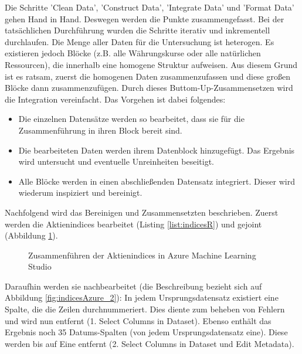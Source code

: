 Die Schritte 'Clean Data', 'Construct Data', 'Integrate Data' und 'Format Data' gehen Hand in Hand. Deswegen werden die Punkte zusammengefasst. Bei der tatsächlichen Durchführung wurden die Schritte iterativ und inkrementell durchlaufen. \newline
Die Menge aller Daten für die Untersuchung ist heterogen. Es existieren jedoch Blöcke (z.B. alle Währungskurse oder alle natürlichen Ressourcen), die innerhalb eine homogene Struktur aufweisen. Aus diesem Grund ist es ratsam, zuerst die homogenen Daten zusammenzufassen und diese großen Blöcke dann zusammenzufügen. Durch dieses Buttom-Up-Zusammensetzen wird die Integration vereinfacht.
Das Vorgehen ist dabei folgendes:
\begin{itemize}
\item Die einzelnen Datensätze werden so bearbeitet, dass sie für die Zusammenführung in ihren Block bereit sind.
\item Die bearbeiteten Daten werden ihrem Datenblock hinzugefügt. Das Ergebnis wird untersucht und eventuelle Unreinheiten beseitigt.
\item Alle Blöcke werden in einen abschließenden Datensatz integriert. Dieser wird wiederum inspiziert und bereinigt.
\end{itemize}
Nachfolgend wird das Bereinigen und Zusammensetzten beschrieben. Zuerst werden die Aktienindices bearbeitet (Listing \ref{list:indicesR}) und gejoint (Abbildung \ref{fig:indicesAzure_1}). 

\begin{figure}[H]
\centering
{}
\caption{Zusammenführen der Aktienindices in Azure Machine Learning Studio}
\label{fig:indicesAzure_1}
\end{figure}
Daraufhin werden sie nachbearbeitet (die Beschreibung bezieht sich auf Abbildung \ref{fig:indicesAzure_2}): In jedem Ursprungsdatensatz existiert eine Spalte, die die Zeilen durchnummeriert. Dies diente zum beheben von Fehlern und wird nun entfernt (1. Select Columns in Dataset). Ebenso enthält das Ergebnis noch 35 Datums-Spalten (von jedem Ursprungsdatensatz eine). Diese werden bis auf Eine entfernt (2. Select Columns in Dataset und Edit Metadata).
